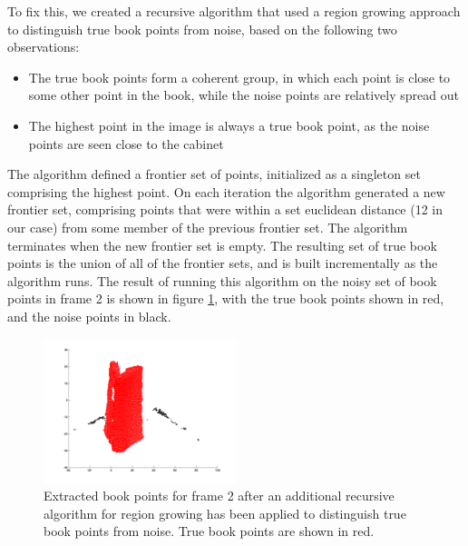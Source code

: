 To fix this, we created a recursive algorithm that used a region growing approach to distinguish true book points from noise, based on the following two observations:

\begin{itemize}
	\item The true book points form a coherent group, in which each point is close to some other point in the book, while the noise points are relatively spread out
	\item The highest point in the image is always a true book point, as the noise points are seen close to the cabinet
\end{itemize}

The algorithm defined a frontier set of points, initialized as a singleton set comprising the highest point. On each iteration the algorithm generated a new frontier set, comprising points that were within a set euclidean distance (12 in our case) from some member of the previous frontier set. The algorithm terminates when the new frontier set is empty. The resulting set of true book points is the union of all of the frontier sets, and is built incrementally as the algorithm runs. The result of running this algorithm on the noisy set of book points in frame 2 is shown in figure \ref{fig:bookPointsFrame2Cleaned}, with the true book points shown in red, and the noise points in black.


\begin{figure}[H]
	\centering
	\includegraphics[width=0.5\textwidth]{Images/6-RegionGrowingCleaning.png}
	\caption{Extracted book points for frame 2 after an additional recursive algorithm for region growing has been applied to distinguish true book points from noise. True book points are shown in red.}
	\label{fig:bookPointsFrame2Cleaned}
\end{figure}


